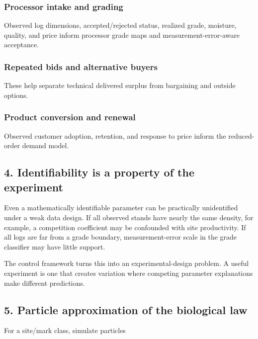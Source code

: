 \subsubsection{Processor intake and grading}\label{processor-intake-and-grading}

Observed log dimensions, accepted/rejected status, realized grade, moisture,
quality, and price inform processor grade maps and measurement-error-aware
acceptance.

\subsubsection{Repeated bids and alternative buyers}\label{repeated-bids-and-alternative-buyers}

These help separate technical delivered surplus from bargaining and outside
options.

\subsubsection{Product conversion and renewal}\label{product-conversion-and-renewal}

Observed customer adoption, retention, and response to price inform the
reduced-order demand model.

\subsection{4. Identifiability is a property of the experiment}\label{identifiability-is-a-property-of-the-experiment}

Even a mathematically identifiable parameter can be practically unidentified
under a weak data design. If all observed stands have nearly the same density,
for example, a competition coefficient may be confounded with site
productivity. If all logs are far from a grade boundary, measurement-error scale
in the grade classifier may have little support.

The control framework turns this into an experimental-design problem. A useful
experiment is one that creates variation where competing parameter explanations
make different predictions.

\subsection{5. Particle approximation of the biological law}\label{particle-approximation-of-the-biological-law}

For a site/mark class, simulate particles

